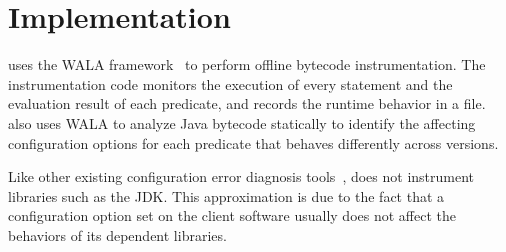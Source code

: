 \section{Implementation}
\label{sec:implementation}

\ourtool uses the WALA framework~\cite{wala} to perform offline
bytecode instrumentation. The instrumentation code
monitors the execution of every statement and the evaluation
result of each predicate, and records the runtime behavior
in a file. \ourtool also uses WALA
to analyze Java bytecode statically to
identify the affecting configuration options
for each predicate that behaves differently across versions.

Like other existing configuration error
diagnosis tools~\cite{Rabkin:2011:PPC, Zhang:2013:ADS}, \ourtool
does not instrument libraries such as the JDK.
This approximation is due to the fact that a configuration
option set on the client software usually
does not affect the behaviors of its dependent libraries.

